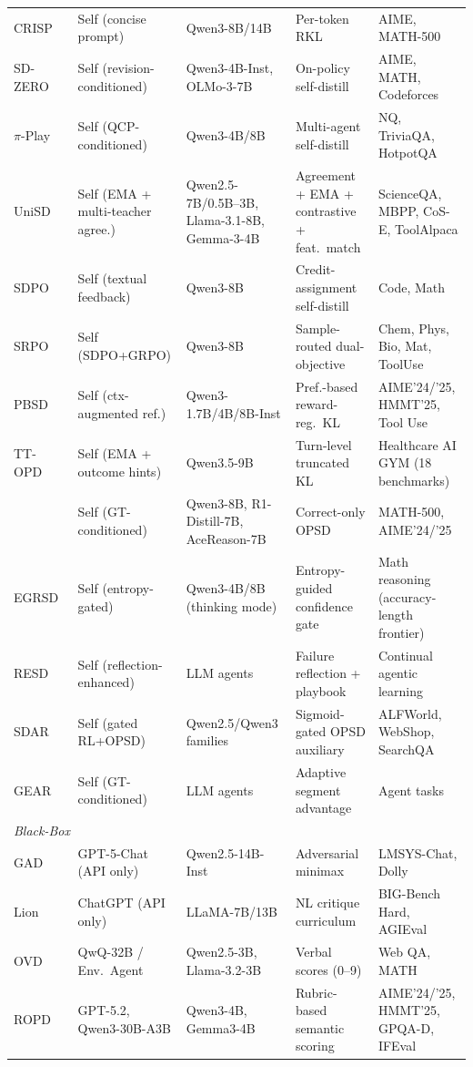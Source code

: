 \documentclass{article} %
\begin{document}
\begin{table}[t]
{\begin{tabular}{@{}lllll@{}}
        \midrule
        CRISP~\citep{2603.05433} & Self (concise prompt) & Qwen3-8B/14B & Per-token RKL & AIME, MATH-500 \\
        SD-ZERO~\citep{2604.12002} & Self (revision-conditioned) & Qwen3-4B-Inst, OLMo-3-7B & On-policy self-distill & AIME, MATH, Codeforces \\
        $\pi$-Play~\citep{2604.14054} & Self (QCP-conditioned) & Qwen3-4B/8B & Multi-agent self-distill & NQ, TriviaQA, HotpotQA \\
        UniSD~\citep{2605.06597} & Self (EMA + multi-teacher agree.) & Qwen2.5-7B/0.5B--3B, Llama-3.1-8B, Gemma-3-4B & Agreement + EMA + contrastive + feat.~match & ScienceQA, MBPP, CoS-E, ToolAlpaca \\
        SDPO~\citep{2601.20802} & Self (textual feedback) & Qwen3-8B & Credit-assignment self-distill & Code, Math \\
        SRPO~\citep{2604.02288} & Self (SDPO+GRPO) & Qwen3-8B & Sample-routed dual-objective & Chem, Phys, Bio, Mat, ToolUse \\
        PBSD~\citep{2605.05040} & Self (ctx-augmented ref.) & Qwen3-1.7B/4B/8B-Inst & Pref.-based reward-reg.\ KL & AIME'24/'25, HMMT'25, Tool Use \\
        TT-OPD~\citep{2605.02943} & Self (EMA + outcome hints) & Qwen3.5-9B & Turn-level truncated KL & Healthcare AI GYM (18 benchmarks) \\
        \citet{2605.06188} & Self (GT-conditioned) & Qwen3-8B, R1-Distill-7B, AceReason-7B & Correct-only OPSD & MATH-500, AIME'24/'25 \\
        EGRSD~\citep{2605.13255} & Self (entropy-gated) & Qwen3-4B/8B (thinking mode) & Entropy-guided confidence gate & Math reasoning (accuracy-length frontier) \\
        RESD~\citep{2605.12741} & Self (reflection-enhanced) & LLM agents & Failure reflection + playbook & Continual agentic learning \\
        SDAR~\citep{2605.15155} & Self (gated RL+OPSD) & Qwen2.5/Qwen3 families & Sigmoid-gated OPSD auxiliary & ALFWorld, WebShop, SearchQA \\
        GEAR~\citep{2605.11853} & Self (GT-conditioned) & LLM agents & Adaptive segment advantage & Agent tasks \\
        \midrule
        \multicolumn{5}{l}{\textit{Black-Box}} \\
        \midrule
        GAD~\citep{2511.10643} & GPT-5-Chat (API only) & Qwen2.5-14B-Inst & Adversarial minimax & LMSYS-Chat, Dolly \\
        Lion~\citep{2305.12870} & ChatGPT (API only) & LLaMA-7B/13B & NL critique curriculum & BIG-Bench Hard, AGIEval \\
        OVD~\citep{2601.21968} & QwQ-32B / Env.~Agent & Qwen2.5-3B, Llama-3.2-3B & Verbal scores (0--9) & Web QA, MATH \\
        ROPD~\citep{2605.07396} & GPT-5.2, Qwen3-30B-A3B & Qwen3-4B, Gemma3-4B & Rubric-based semantic scoring & AIME'24/'25, HMMT'25, GPQA-D, IFEval \\
        \bottomrule
    \end{tabular}
    }
\end{table}
\end{document}
